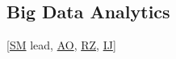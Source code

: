 \documentclass[11pt]{NSFamsart}
\newcommand{\cmtS}[1]{{\color{blue}{(Simon: #1)}}}
\newcommand{\SM}{\hyperlink{SMlink}{SM}\xspace}
\newcommand{\AO}{\hyperlink{AOlink}{AO}\xspace}
\newcommand{\IJi}{\hyperlink{IJlink}{IJ}\xspace}
\newcommand{\RZ}{\hyperlink{RZlink}{RZ}\xspace}
\newcommand{\SMNote}[1]{{\color{blue}Simon: #1}}
\begin{document}





\subsection{Big Data Analytics} [\SM lead, \AO, \RZ, \IJi{}] \label{sec:bigdata}
\end{document}
